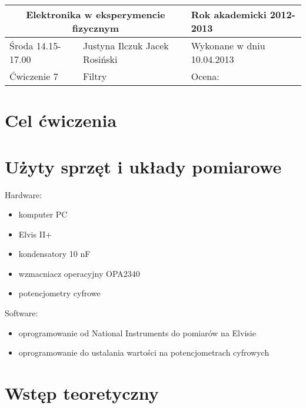 \documentclass[a4paper,11pt]{article}
\author{Justyna Ilczuk, Jacek Rosiński}
\begin{document}
\begin{center}

    \begin{tabular}{ | m{5cm}| m{5cm} | m{5cm} |}
    \hline 
    \multicolumn{2}{|c|}{Elektronika w eksperymencie fizycznym}
    & Rok akademicki 2012-2013 \\ 
    
    \hline
    Środa 14.15-17.00 
    & Justyna Ilczuk \newline Jacek Rosiński
    & Wykonane w dniu 10.04.2013 \\
   	
   	\hline
   	Ćwiczenie 7 & Filtry &    Ocena: \\
   	\hline
    \end{tabular}
\end{center}

\pagestyle{fancy}
\fancyfoot[CO]{\ }
\fancyhead[RO]{\footnotesize{\thepage} }




\section{Cel ćwiczenia}

\section{Użyty sprzęt i układy pomiarowe}

Hardware:
\begin{itemize}
\item komputer PC
\item Elvis II+
\item kondensatory 10 nF
\item wzmacniacz operacyjny OPA2340
\item potencjometry cyfrowe
\end{itemize}

Software:
\begin{itemize}
\item oprogramowanie od National Instruments do pomiarów na Elvisie
\item oprogramowanie do ustalania wartości na potencjometrach cyfrowych
\end{itemize}

\section{Wstęp teoretyczny}
\end{document}
